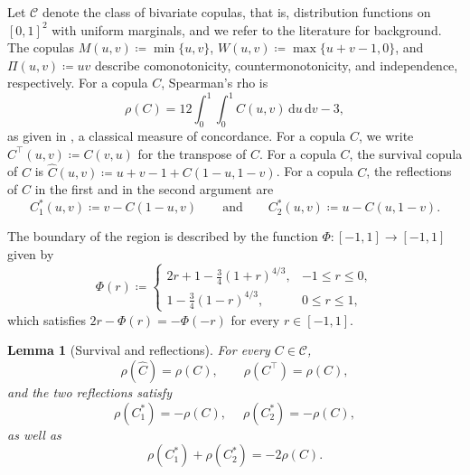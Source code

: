 \documentclass{article}
\newif\ifmarked
\newcommand{\rev}[1]{\ifmarked{\color{magenta}#1}\else#1\fi}
\newcommand{\revon}{\ifmarked\color{magenta}\fi}
\newcommand{\moved}[1]{\ifmarked\marginpar{\raggedright\scriptsize\color{magenta}#1}\fi}
\newcommand{\CC}{\mathcal{C}}
\newcommand{\de}{\,\mathrm{d}}
\newcommand{\rone}[1]{#1_{1}^{*}}
\newcommand{\rtwo}[1]{#1_{2}^{*}}
\newtheorem{lemma}[theorem]{Lemma}
\begin{document}
Let $\CC$ denote the class of bivariate copulas, that is, distribution functions on $[0,1]^2$ with uniform marginals, and we refer to the literature for background.
The copulas $M(u,v)\coloneqq\min\{u,v\}$, $W(u,v)\coloneqq\max\{u+v-1,0\}$, and $\Pi(u,v)\coloneqq uv$ describe comonotonicity, countermonotonicity, and independence, respectively.
For a copula $C$, Spearman's rho is
\begin{equation}
  \label{eq:rho}
  \rho(C)=12\int_0^1\!\int_0^1 C(u,v)\de u\de v-3,
\end{equation}
as given in \cite[Sec.~5]{nelsen}, a classical measure of concordance.
For a copula $C$, we write $C^\top(u,v)\coloneqq C(v,u)$ for the transpose of $C$.
\rev{For a copula $C$, the survival copula of $C$ is $\widehat C(u,v)\coloneqq u+v-1+C(1-u,1-v)$.
For a copula $C$, the reflections of $C$ in the first and in the second argument are
\[
  \rone{C}(u,v)\coloneqq v-C(1-u,v)
  \qquad\text{and}\qquad
  \rtwo{C}(u,v)\coloneqq u-C(u,1-v).
\]}

\moved{Moved here from the introduction.}%
\rev{The boundary of the region is described by the function} $\Phi:[-1,1]\to[-1,1]$ \rev{given} by
\begin{equation}
  \label{eq:Phi}
  \Phi(r)\coloneqq
  \begin{cases}
    2r+1-\frac34(1+r)^{4/3}, & -1\le r\le0,\\[0.3ex]
    1-\frac34(1-r)^{4/3}, & 0\le r\le1,
  \end{cases}
\end{equation}
\rev{which satisfies} $2r-\Phi(r)=-\Phi(-r)$ for every $r\in[-1,1]$.

\begin{lemma}[\rev{Survival and reflections}]
\label{lem:symmetries}
For every $C\in\CC$,
\begin{equation}
  \rho(\widehat C)=\rho(C),\qquad
  \rho(C^\top)=\rho(C),
\end{equation}
\rev{and the two reflections satisfy}
\begin{equation}
  \revon
  \rho(\rone{C})=-\rho(C),\quad\;
  \rho(\rtwo{C})=-\rho(C),
\end{equation}
\rev{as well as}
\begin{equation}
  \revon
  \rho(\rone{C})+\rho(\rtwo{C})=-2\rho(C).
\end{equation}
\end{lemma}
\end{document}
